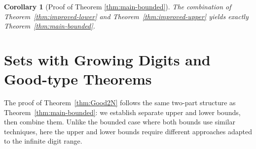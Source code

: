 \documentclass[12pt]{article}
\newtheorem{corollary}[theorem]{Corollary}
\numberwithin{equation}{section}
\begin{document}
\begin{corollary}[Proof of Theorem \ref{thm:main-bounded}]
The combination of Theorem~\ref{thm:improved-lower} and Theorem~\ref{thm:improved-upper} 
yields exactly Theorem~\ref{thm:main-bounded}.
\end{corollary}


\section{Sets with Growing Digits and Good-type Theorems}

The proof of Theorem~\ref{thm:Good2N} follows the same two-part structure 
as Theorem~\ref{thm:main-bounded}: we establish separate upper and lower bounds, 
then combine them. Unlike the bounded case where both bounds use similar 
techniques, here the upper and lower bounds require different approaches 
adapted to the infinite digit range.
\end{document}
